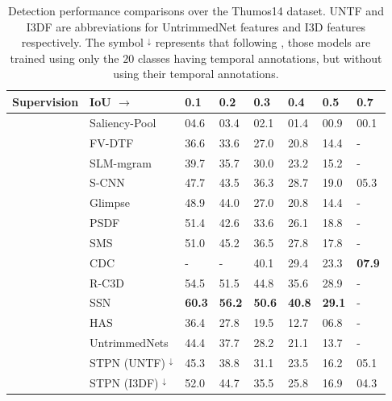 \documentclass[runningheads]{llncs}
\begin{document}
\begin{table}[h!]
	\fontsize{8.5}{9.5}\selectfont
	\centering	
	\caption{Detection performance comparisons over the Thumos14 dataset. UNTF and I3DF are abbreviations for UntrimmedNet features and I3D features respectively. The symbol $^\downarrow$ represents that following \cite{nguyen2017weakly}, those models are trained using only the $20$ classes having temporal annotations, but without using their temporal annotations.}
	\begin{tabular}{C{1.9cm} || p{2.8cm} || C{1cm} C{1cm}  C{1cm}  C{1cm}  C{1cm} C{1cm}}
		\hline
		{Supervision} & {IoU $\rightarrow$} & {0.1} & {0.2} & {0.3} & {0.4} & {0.5} & {0.7}\\
		\hline \hline
		{} & {Saliency-Pool \cite{karaman2014fast}} & {04.6} & {03.4} & {02.1} & {01.4} & {00.9} & {00.1}\\
& {FV-DTF \cite{oneata2014lear}} & {36.6} & {33.6} & {27.0} & {20.8} & {14.4} & {-}\\
& {SLM-mgram \cite{richard2016temporal}} & {39.7} & {35.7} & {30.0} & {23.2} & {15.2} & {-}\\
& {S-CNN \cite{shou2016temporal}} & {47.7} & {43.5} & {36.3} & {28.7} & {19.0} & {05.3}\\
& {Glimpse \cite{yeung2016end}} & {48.9} & {44.0} & {27.0} & {20.8} & {14.4} & {-}\\
		& {PSDF \cite{yuan2016temporal}} & {51.4} & {42.6} & {33.6} & {26.1} & {18.8} & {-}\\
		& {SMS \cite{yuan2017temporal}} & {51.0} & {45.2} & {36.5} & {27.8} & {17.8} & {-}\\
		& {CDC \cite{shou2017cdc}} & {-} & {-} & {40.1} & {29.4} & {23.3} & {\textbf{07.9}}\\
& {R-C3D \cite{xu2017r}} & {54.5} & {51.5} & {44.8} & {35.6} & {28.9} & {-}\\	
		& {SSN \cite{zhao2017temporal}} & {\textbf{60.3}} & {\textbf{56.2}} & {\textbf{50.6}} & {\textbf{40.8}} & {\textbf{29.1}} & {-}\\	
		\hline
		\hline
		{} & {HAS \cite{singh2017hide}} & {36.4} & {27.8} & {19.5} & {12.7} & {06.8} & {-} \\
& {UntrimmedNets \cite{wang2017untrimmednets}} & {44.4} & {37.7} & {28.2} & {21.1} & {13.7} & {-}\\
		& {STPN (UNTF) \cite{nguyen2017weakly} $^\downarrow$} & {45.3} & {38.8} & {31.1} & {23.5} & {16.2} & {05.1}\\
		& {STPN (I3DF) \cite{nguyen2017weakly} $^\downarrow$} & {52.0} & {44.7} & {35.5} & {25.8} & {16.9} & {04.3}\\

\end{tabular}
\end{table}
\end{document}
